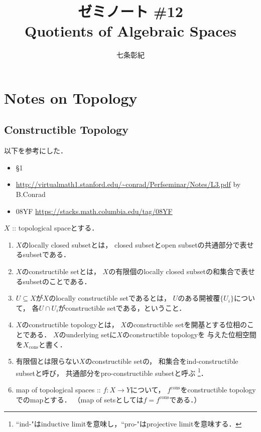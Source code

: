 \documentclass[a4paper, dvipdfmx]{jsarticle}
\newcommand{\cons}{\mathrm{cons}}
\begin{document}
\title{ゼミノート \#12 \\ Quotients of Algebraic Spaces}
\author{七条彰紀}
\maketitle
\tableofcontents
\vspace{10pt}

\section{Notes on Topology}
\subsection{Constructible Topology}
以下を参考にした．
\begin{itemize}
    \item \cite{Rydh10} \S1
    \item \url{http://virtualmath1.stanford.edu/~conrad/Perfseminar/Notes/L3.pdf} by B.Conrad
    \item \cite{SP} 08YF \url{https://stacks.math.columbia.edu/tag/08YF}
\end{itemize}

\begin{Def}
    $X$ :: topological spaceとする．
    \begin{enumerate}
    \item 
        $X$のlocally closed subsetとは，
        closed subsetとopen subsetの共通部分で表せるsubsetである．

    \item
        $X$のconstructible setとは，
        $X$の有限個のlocally closed subsetの和集合で表せるsubsetのことである．

    \item
        $U \subseteq X$が$X$のlocally constructible setであるとは，
        $U$のある開被覆$\{U_i\}$について，
        各$U \cap U_i$がconstructible setである，ということ．

    \item
        $X$のconstructible topologyとは，
        $X$のconstructible setを開基とする位相のことである．
        $X$のunderlying setに$X$のconstructible topologyを
        与えた位相空間を$X_{\cons}$と書く．

    \item
        有限個とは限らない$X$のconstructible setの，
        和集合をind-constructible subsetと呼び，
        共通部分をpro-constructible subsetと呼ぶ
        \footnote{ ``ind-"はinductive limitを意味し，``pro-"はprojective limitを意味する． }．

    \item
        map of topological spaces :: $f \colon X \to Y$について，
        $f^{\cons}$をconstructible topologyでのmapとする．
        （map of setsとしては$f=f^{\cons}$である．）
    \end{enumerate}
\end{Def}
\end{document}
